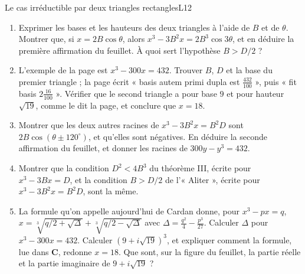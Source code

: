 \documentclass[11pt,a4paper]{article}
\begin{document}
\begin{exercice}{Le cas irréductible par deux triangles rectangles}{L1}{2}
\begin{enumerate}
\item Exprimer les bases et les hauteurs des deux triangles à l'aide de $B$ et de
  $\theta$. Montrer que, si $x = 2B\cos\theta$, alors
  $x^3 - 3B^2x = 2B^3\cos 3\theta$, et en déduire la première affirmation du
  feuillet. À quoi sert l'hypothèse $B > D/2$ ?
\item L'exemple de la page est $x^3 - 300x = 432$. Trouver $B$, $D$ et la base
  du premier triangle ; la page écrit « basis autem primi dupla est
  $\frac{432}{100}$ », puis « fit basis $2\frac{16}{100}$ ». Vérifier que le second
  triangle a pour base $9$ et pour hauteur $\sqrt{19}$, comme le dit la page, et
  conclure que $x = 18$.
\item Montrer que les deux autres racines de $x^3 - 3B^2x = B^2D$ sont
  $2B\cos(\theta \pm 120^\circ)$, et qu'elles sont négatives. En déduire la seconde
  affirmation du feuillet, et donner les racines de $300y - y^3 = 432$.
\item Montrer que la condition $D^2 < 4B^3$ du théorème III, écrite pour
  $x^3 - 3Bx = D$, et la condition $B > D/2$ de l'« Aliter », écrite pour
  $x^3 - 3B^2x = B^2D$, sont la même.
\item La formule qu'on appelle aujourd'hui de Cardan donne, pour $x^3 - px = q$,
  $x = \sqrt[3]{q/2 + \sqrt{\Delta}} + \sqrt[3]{q/2 - \sqrt{\Delta}}$ avec
  $\Delta = \frac{q^2}{4} - \frac{p^3}{27}$. Calculer $\Delta$ pour
  $x^3 - 300x = 432$. Calculer $(9 + i\sqrt{19})^3$, et expliquer comment la
  formule, lue dans $\mathbf{C}$, redonne $x = 18$. Que sont, sur la figure du
  feuillet, la partie réelle et la partie imaginaire de $9 + i\sqrt{19}$ ?
\end{enumerate}
\end{exercice}
\end{document}
